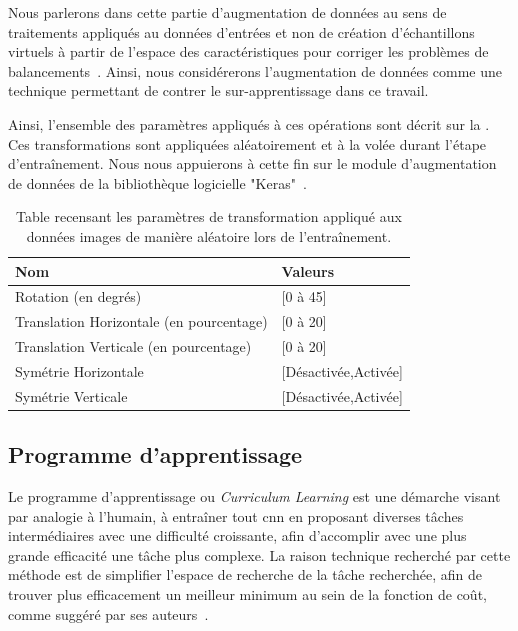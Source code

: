 Nous parlerons dans cette partie d'augmentation de données au sens de traitements appliqués au données d'entrées et non de création d'échantillons virtuels à partir de l'espace des caractéristiques pour corriger les problèmes de balancements~\cite{Wong2016}. Ainsi, nous considérerons l'augmentation de données comme une technique permettant de contrer le sur-apprentissage dans ce travail.\par

Ainsi, l'ensemble des paramètres appliqués à ces opérations sont décrit sur la . Ces transformations sont appliquées aléatoirement et à la volée durant l'étape d'entraînement. Nous nous appuierons à cette fin sur le module d'augmentation de données de la bibliothèque logicielle "Keras"~\cite{chollet2015}.\par

\begin{table}[H]
    \centering
    \begin{tabular}{ll}
        \toprule
        \textbf{Nom}                            & \textbf{Valeurs}      \\ \midrule
        Rotation (en degrés)                    & [0 à 45]              \\ 
        Translation Horizontale (en pourcentage)& [0 à 20]              \\ 
        Translation Verticale (en pourcentage)  & [0 à 20]              \\  
        Symétrie Horizontale                    & [Désactivée,Activée]  \\  
        Symétrie Verticale                      & [Désactivée,Activée]  \\ 
        \bottomrule 
    \end{tabular} 
    \caption{Table recensant les paramètres de transformation appliqué aux données images de manière aléatoire lors de l'entraînement.}
    \label{tab:image_improvement_data_augmentation}
\end{table}\par

\subsection{Programme d'apprentissage}
Le programme d'apprentissage ou \textit{Curriculum Learning} est une démarche visant par analogie à l'humain, à entraîner tout \gls{cnn} en proposant diverses tâches intermédiaires avec une difficulté croissante, afin d'accomplir avec une plus grande efficacité une tâche plus complexe. La raison technique recherché par cette méthode est de simplifier l'espace de recherche de la tâche recherchée, afin de trouver plus efficacement un meilleur minimum au sein de la fonction de coût, comme suggéré par ses auteurs~\cite{Bengio2009}.\par


